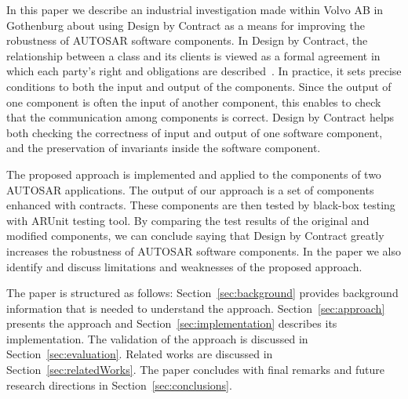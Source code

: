 In this paper we describe an industrial investigation made within Volvo AB in Gothenburg about using %
Design by Contract as a means for improving the robustness of AUTOSAR software components. 
In Design by Contract, the relationship between a class and its clients is viewed as a formal agreement in which each party's right and obligations are described~\cite{jj}. In practice, it sets precise conditions to both the input and output of the components. %
Since the output of one component is often the input of another component, this enables to check that the communication among components is correct. Design by Contract helps both checking the correctness of input and output of one software component, and %
the preservation of invariants inside the software component. %
%


The proposed approach is implemented and applied to the components of two AUTOSAR applications. %
The output of our approach is a set of components enhanced with contracts. These  components %
are then tested by black-box testing with ARUnit testing tool. By comparing the test results of the original and modified components, we can conclude saying that Design by Contract greatly increases the robustness of AUTOSAR software components. In the paper we also identify and discuss limitations and weaknesses of the proposed approach.

The paper is structured as follows: Section~\ref{sec:background} provides background information that is needed to understand the approach. Section~\ref{sec:approach} presents the approach and Section~\ref{sec:implementation} describes its implementation. The validation of the approach is discussed in Section~\ref{sec:evaluation}. Related works are discussed in Section~\ref{sec:relatedWorks}. The paper concludes with final remarks and future research directions in Section~\ref{sec:conclusions}.


